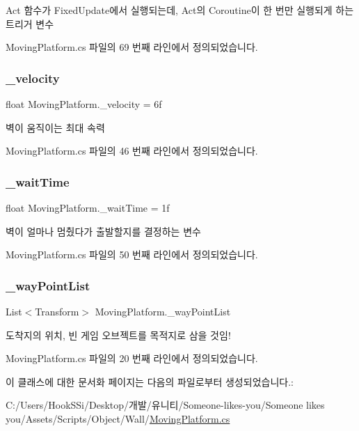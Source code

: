 Act 함수가 Fixed\+Update에서 실행되는데, Act의 Coroutine이 한 번만 실행되게 하는 트리거 변수 



Moving\+Platform.\+cs 파일의 69 번째 라인에서 정의되었습니다.

\mbox{\label{class_moving_platform_a831cd24df75aa37f0897741d189686a7}} 
\subsubsection{\texorpdfstring{\_velocity}{\_velocity}}
{\footnotesize\ttfamily float Moving\+Platform.\+\_\+velocity = 6f}



벽이 움직이는 최대 속력 



Moving\+Platform.\+cs 파일의 46 번째 라인에서 정의되었습니다.

\mbox{\label{class_moving_platform_af1a2156a73b89603147dc4009679c738}} 
\subsubsection{\texorpdfstring{\_waitTime}{\_waitTime}}
{\footnotesize\ttfamily float Moving\+Platform.\+\_\+wait\+Time = 1f}



벽이 얼마나 멈췄다가 출발할지를 결정하는 변수 



Moving\+Platform.\+cs 파일의 50 번째 라인에서 정의되었습니다.

\mbox{\label{class_moving_platform_a59ac15d3e2b4bff0df981fa4839e5f61}} 
\subsubsection{\texorpdfstring{\_wayPointList}{\_wayPointList}}
{\footnotesize\ttfamily List$<$Transform$>$ Moving\+Platform.\+\_\+way\+Point\+List}



도착지의 위치, 빈 게임 오브젝트를 목적지로 삼을 것임! 



Moving\+Platform.\+cs 파일의 20 번째 라인에서 정의되었습니다.



이 클래스에 대한 문서화 페이지는 다음의 파일로부터 생성되었습니다.\+:\begin{DoxyCompactItemize}
\item 
C\+:/\+Users/\+Hook\+S\+Si/\+Desktop/개발/유니티/\+Someone-\/likes-\/you/\+Someone likes you/\+Assets/\+Scripts/\+Object/\+Wall/\mbox{\hyperlink{_moving_platform_8cs}{Moving\+Platform.\+cs}}\end{DoxyCompactItemize}
